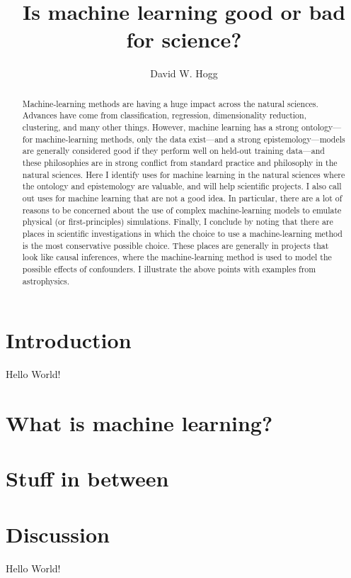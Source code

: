 \documentclass[modern]{aastex631}
\begin{document}
\title{Is machine learning good or bad for science?}

\author{David W. Hogg}

\begin{abstract}\noindent %
  Machine-learning methods are having a huge impact across the natural sciences.
  Advances have come from classification, regression, dimensionality reduction, clustering, and many other things.
  However, machine learning has a strong ontology---for machine-learning methods, only the data exist---and a strong epistemology---models are generally considered good if they perform well on held-out training data---and these philosophies are in strong conflict from standard practice and philosophy in the natural sciences.
  Here I identify uses for machine learning in the natural sciences where the ontology and epistemology are valuable, and will help scientific projects.
  I also call out uses for machine learning that are not a good idea.
  In particular, there are a lot of reasons to be concerned about the use of complex machine-learning models to emulate physical (or first-principles) simulations.
  Finally, I conclude by noting that there are places in scientific investigations in which the choice to use a machine-learning method is the most conservative possible choice.
  These places are generally in projects that look like causal inferences, where the machine-learning method is used to model the possible effects of confounders.
  I illustrate the above points with examples from astrophysics.
\end{abstract}

\section{Introduction}\label{sec:intro}

Hello World!

\section{What is machine learning?}\label{sec:what}

\section{Stuff in between}\label{sec:stuff}

\section{Discussion}\label{sec:discussion}

Hello World!

{}

\end{document}
